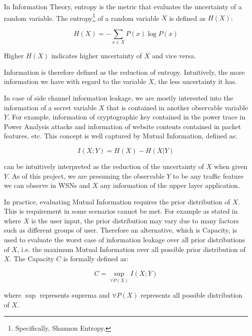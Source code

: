 In Information Theory, entropy is the metric that evaluates the uncertainty of a random variable. The entropy\footnote{Specifically, Shannon Entropy.}  of a random variable $X$ is defined as $H(X)$:

\begin{equation} \label{Eq: Entropy}
	H(X) = - \sum_{x \in X}{P(x) \log{P(x)}}
\end{equation}

Higher $H(X)$ indicates higher uncertainty of $X$ and vice versa.

Information is therefore defined as the reduction of entropy. Intuitively, the more information we have with regard to the variable $X$, the less uncertainty it has.

In case of side channel information leakage, we are mostly interested into the information of a secret variable $X$ that is contained in another observable variable $Y$. For example, information of cryptographic key contained in the power trace in Power Analysis attacks and information of website contents contained in packet features, etc. This concept is well captured by Mutual Information, defined as:

\begin{equation} \label{Eq: MI}
	I(X;Y) = H(X) - H(X | Y)
\end{equation}

 can be intuitively interpreted as the reduction of the uncertainty of $X$ when given $Y$. As of this project, we are presuming the observable $Y$ to be any traffic feature we can observe in WSNs and $X$ any information of the upper layer application.

In practice, evaluating Mutual Information requires the prior distribution of $X$. This is requirement in some scenarios cannot be met. For example as stated in \cite{PinpointWeb} where $X$ is the user input, the prior distribution may vary due to many factors such as different groups of user. Therefore an alternative, which is Capacity, is used to evaluate the worst case of information leakage over all prior distributions of $X$, i.e. the maximum Mutual Information over all possible prior distribution of $X$. The Capacity $C$ is formally defined as:

\begin{equation} \label{Eq: Capacity}
	C = \sup_{\forall P(X)}{I(X;Y)}
\end{equation}

where $\sup$ represents suprema and $\forall P(X)$ represents all possible distribution of $X$.

